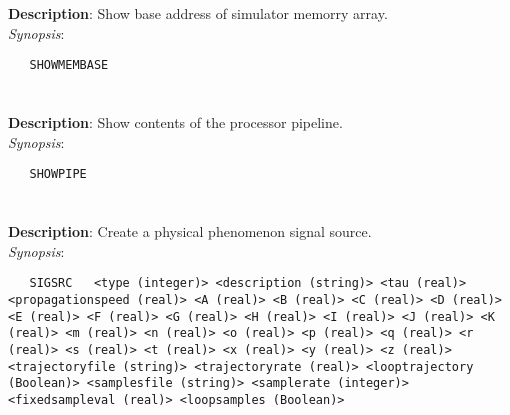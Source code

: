 \section{\quad{}}
\label{manpages:SHOWMEMBASE}
\label{manpages:showmembase}
\vspace{-0.1in}
{\bf Description}: 	Show base address of simulator memorry array.\\[1.5ex]
{\em Synopsis}:
\vspace{-0.05in}
\scriptsize
\begin{lstlisting}
   SHOWMEMBASE   								
\end{lstlisting}
\normalsize
\vspace{-0.05in}


\section{\quad{}}
\label{manpages:SHOWPIPE}
\label{manpages:showpipe}
\vspace{-0.1in}
{\bf Description}: 	Show contents of the processor pipeline.\\[1.5ex]
{\em Synopsis}:
\vspace{-0.05in}
\scriptsize
\begin{lstlisting}
   SHOWPIPE   									
\end{lstlisting}
\normalsize
\vspace{-0.05in}


\section{\quad{}}
\label{manpages:SIGSRC}
\label{manpages:sigsrc}
\vspace{-0.1in}
{\bf Description}: 	Create a physical phenomenon signal source.\\[1.5ex]
{\em Synopsis}:
\vspace{-0.05in}
\scriptsize
\begin{lstlisting}
   SIGSRC   <type (integer)> <description (string)> <tau (real)> <propagationspeed (real)> <A (real)> <B (real)> <C (real)> <D (real)> <E (real)> <F (real)> <G (real)> <H (real)> <I (real)> <J (real)> <K (real)> <m (real)> <n (real)> <o (real)> <p (real)> <q (real)> <r (real)> <s (real)> <t (real)> <x (real)> <y (real)> <z (real)> <trajectoryfile (string)> <trajectoryrate (real)> <looptrajectory (Boolean)> <samplesfile (string)> <samplerate (integer)> <fixedsampleval (real)> <loopsamples (Boolean)>	
\end{lstlisting}
\normalsize
\vspace{-0.05in}


